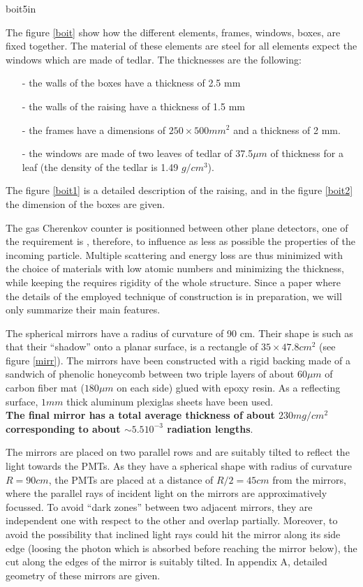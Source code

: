 \documentclass[12pt]{article}
\begin{document}
 {boit}{5in}
              
   The figure \ref{boit} show how the different elements, 
frames, windows, boxes,  
 are fixed together. The material of these elements are steel for all
 elements expect the windows which are made of tedlar. The thicknesses are
 the following:
\begin{itemize}
\item[-] the walls of the boxes have a thickness of 2.5 mm
\item[-] the walls of the raising have a thickness of 1.5 mm
\item[-] the frames have a dimensions of $250 \times 500 mm^2$ and a thickness
of 2 mm.
\item[-] the windows are made of two leaves of tedlar of 37.5$\mu m$ of
thickness for a leaf (the density of the tedlar is 1.49 $g/cm^3$).
\end{itemize}

The figure \ref{boit1} is a detailed description of the raising, 
and in the figure \ref{boit2} the dimension of the boxes are given.

The gas Cherenkov counter is positionned between other plane detectors, one
of the requirement is , therefore, to influence as less as possible the 
properties of the incoming particle. Multiple scattering and energy loss are 
thus minimized with the choice of materials with low atomic numbers and
minimizing the thickness, while keeping the requires rigidity of the 
whole structure. Since a paper where the details of the employed technique of
construction is in preparation, we will only summarize their main features.

The spherical mirrors have a radius of curvature of 90 cm. Their shape is 
such as that their ``shadow'' onto a planar surface, is a rectangle
of $35 \times 47.8 cm^2$ (see figure \ref{mirr}).
 The mirrors have been constructed with a rigid
backing made of a sandwich of phenolic honeycomb between two triple layers
of about $60 \mu m$ of carbon fiber mat ($180 \mu m$ on each side) glued with
epoxy resin. As a reflecting surface, $ 1mm$ thick aluminum plexiglas sheets 
have been used. \\
{\bf The final mirror has a total average thickness of about $230 mg/cm^2$ 
corresponding to about $\sim 5.5 10^{-3}$ radiation lengths}.

The mirrors are placed on two parallel rows and are suitably tilted to 
reflect the light towards the PMTs. As they have a spherical shape with radius 
of curvature $R=90 cm$, the PMTs are placed at a distance of $R/2=45 cm$ from
the mirrors, where the parallel rays of incident light on the mirrors are
approximatively focussed. To avoid ``dark zones'' between two adjacent mirrors,
they are independent one with respect to the other and overlap partially. 
Moreover, to avoid the possibility that inclined light rays could hit the mirror
along its side edge (loosing the photon which is absorbed before reaching the
mirror below), the cut along the edges of the mirror is suitably tilted. In
appendix A, detailed geometry of these mirrors are given.
\end{document}
